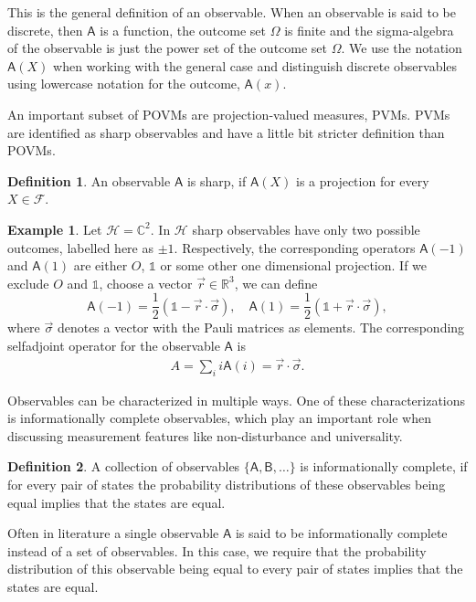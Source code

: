 \documentclass[a4paper,12pt]{wihuri}
\theoremstyle{definition}
\newtheorem{definition}{Definition}
\newtheorem{example}{Example}
\numberwithin{definition}{section}
\numberwithin{example}{section}
\numberwithin{theorem}{section}
\numberwithin{proposition}{section}
\numberwithin{lemma}{section}
\newcommand{\hi}{\mathcal{H}}%
\newcommand{\salg}{\mathcal{F}}%
\newcommand{\A}{\mathsf{A}}%
\newcommand{\B}{\mathsf{B}}%
\newcommand{\id}{\mathds{1}}
\newcommand{\cc}{\mathbb{C}^2}%
\begin{document}
This is the general definition of an observable. When an observable is said to be discrete, then $\A$ is a function, the outcome set $\Omega$ is finite and the sigma-algebra of the observable is just the power set of the outcome set $\Omega$. We use the notation $\A(X)$ when working with the general case and distinguish discrete observables using lowercase notation for the outcome, $\A(x)$. 

An important subset of POVMs are projection-valued measures, PVMs. PVMs are identified as sharp observables and have a little bit stricter definition than POVMs.
\begin{definition}
An observable $\A$ is sharp, if $\A(X)$ is a projection for every $X \in \salg$.
\end{definition}


\begin{example}
Let $\hi = \cc$. In $\hi$ sharp observables have only two possible outcomes, labelled here as $\pm 1$. Respectively, the corresponding operators $\A(-1)$ and $\A(1)$ are either $O$, $\id$ or some other one dimensional projection. If we exclude $O$ and $\id$, choose a vector $\vec{r} \in \mathbb{R}^3$, we can define
\begin{equation}\label{sharp_qubit}
\A(-1) = \frac{1}{2}(\id - \vec{r}\cdot\vec{\sigma}), \quad \A(1) = \frac{1}{2}(\id + \vec{r}\cdot\vec{\sigma}),
\end{equation}
where $\vec{\sigma}$ denotes a vector with the Pauli matrices as elements. The corresponding selfadjoint operator for the observable $\A$ is 
\begin{align*}
A = \sum_i i\A(i) = \vec{r}\cdot \vec{\sigma}\text{.}
\end{align*}
\end{example}



Observables can be characterized in multiple ways. One of these characterizations is informationally complete observables, which play an important role when discussing measurement features like non-disturbance and universality.
\begin{definition}
A collection of observables $\lbrace \A, \B, \ldots \rbrace$ is informationally complete, if for every pair of states the probability distributions of these observables being equal implies that the states are equal.

Often in literature a single observable $\A$ is said to be informationally complete instead of a set of observables. In this case, we require that the probability distribution of this observable being equal to every pair of states implies that the states are equal.
\end{definition}
\end{document}
